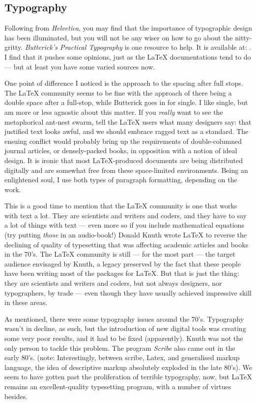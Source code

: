 \documentclass[12pt, oneside]{memoir}
\begin{document}
\subsection*{Typography}
Following from \emph{Helvetica}, you may find that the importance of typographic design has been illuminated, but you will not be any wiser on how to go about the nitty-gritty. \emph{Butterick's Practical Typography} is one resource to help. It is available at: . I find that it pushes some opinions, just as the \LaTeX{} documentations tend to do — but at least you have some varied sources now. 

One point of difference I noticed is the approach to the spacing after full stops. The \LaTeX{} community seems to be fine with the approach of there being a double space after a full-stop, while Butterick goes in for single. I like single, but am more or less agnostic about this matter. If you \emph{really} want to see the metaphorical ant-nest swarm, tell the \LaTeX{} users what many designers say: that justified text looks awful, and we should embrace ragged text as a standard. The ensuing conflict would probably bring up the requirements of double-columned journal articles, or densely-packed books, in opposition with a notion of ideal design. It is ironic that most \LaTeX{}-produced documents are being distributed digitally and are somewhat free from these space-limited environments. Being an enlightened soul, I use both types of paragraph formatting, depending on the work.

This is a good time to mention that the \LaTeX{} community is one that works with text a lot. They are scientists and writers and coders, and they have to say a lot of things with text — even more so if you include mathematical equations (try putting \emph{those} in an audio-book!) Donald Knuth wrote \LaTeX{} to reverse the declining of quality of typesetting that was affecting academic articles and books in the 70's. The \LaTeX{} community is still — for the most part — the target audience envisaged by Knuth, a legacy preserved by the fact that these people have been writing most of the packages for \LaTeX{}. But that is just the thing: they are scientists and writers and coders, but not always designers, nor typographers, by trade — even though they have usually achieved impressive skill in these areas.

As mentioned, there were some typography issues around the 70's. Typography wasn't in decline, as such, but the introduction of new digital tools was creating some very poor results, and it had to be fixed (apparently). Knuth was not the only person to tackle this problem. The program \emph{Scribe} also came out in the early 80's. (note: Interestingly, between scribe, Latex, and generalised markup language, the idea of descriptive markup absolutely exploded in the late 80's). We seem to have gotten past the proliferation of terrible typography, now, but \LaTeX{} remains an excellent-quality typesetting program, with a number of virtues besides.
\end{document}
